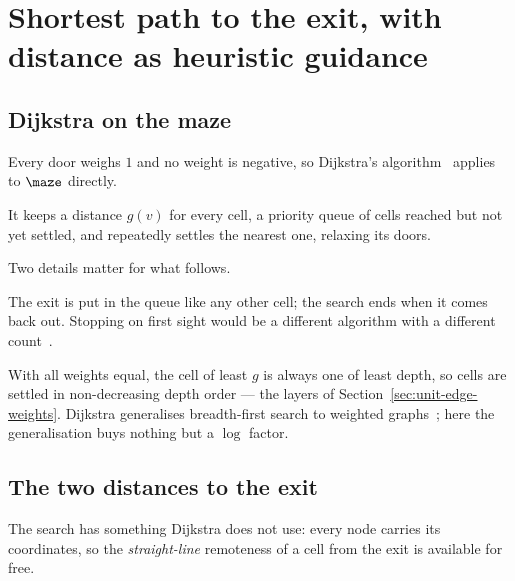 \section{Shortest path to the exit, with distance as heuristic guidance}
\label{sec:shortest-path}

\subsection{Dijkstra on the maze}

Every door weighs $1$ and no weight is negative, so Dijkstra's
algorithm~\cite{dijkstra1959note} applies to $\maze$ directly.

It keeps a distance $g(v)$ for every cell, a priority queue of cells reached but
not yet settled, and repeatedly settles the nearest one, relaxing its doors.

Two details matter for what follows.

\begin{description}[leftmargin=*,style=nextline,itemsep=5pt]
  \item[It stops when the exit is \emph{settled}, not when it is reached.] The
    exit is put in the queue like any other cell; the search ends when it comes
    back out. Stopping on first sight would be a different algorithm with a
    different count~\cite{holte2010misconceptions}.
  \item[On unit weights it is breadth-first search.] With all weights equal, the
    cell of least $g$ is always one of least depth, so cells are settled in
    non-decreasing depth order --- the layers of
    Section~\ref{sec:unit-edge-weights}. Dijkstra generalises breadth-first
    search to weighted graphs~\cite[Ch.~22]{cormen2022introduction}; here the
    generalisation buys nothing but a $\log$ factor.
\end{description}

\subsection{The two distances to the exit}

The search has something Dijkstra does not use: every node carries its
coordinates, so the \emph{straight-line} remoteness of a cell from the exit is
available for free.

